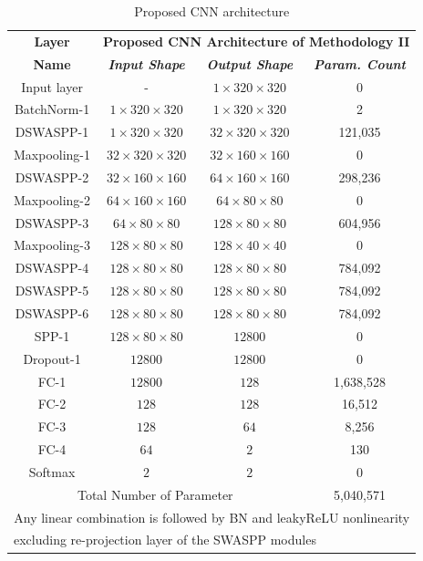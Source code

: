 \renewcommand{\arraystretch}{1.5}
\begin{table}[htbp]
    \caption{Proposed CNN architecture}
    \begin{center}
    \begin{tabular}{|c|c|c|c|}
    \hline
    \textbf{Layer}&\multicolumn{3}{|c|}{\textbf{Proposed CNN Architecture of Methodology II}} \\
    \cline{2-4} 
    \textbf{Name} & \textbf{\textit{Input Shape}}& \textbf{\textit{Output Shape}}& \textbf{\textit{Param. Count}} \\
    \hline
    Input layer & - & $1 \times 320 \times 320$ & 0 \\
    \hline
    BatchNorm-1 & $1 \times 320 \times 320$ & $1 \times 320 \times 320$ & 2 \\
    \hline
    DSWASPP-1& $1 \times 320 \times 320$ & $32 \times 320 \times 320$ & 121,035  \\
    \hline
    Maxpooling-1& $32 \times 320 \times 320$ &$32 \times 160 \times 160$ & 0 \\
    \hline
    DSWASPP-2& $32 \times 160 \times 160$ & $64 \times 160 \times 160$ & 298,236  \\
    \hline
    Maxpooling-2 & $64 \times 160 \times 160$ & $64 \times 80 \times 80$ &0  \\
    \hline
    DSWASPP-3  & $64 \times 80 \times 80$ & $128 \times 80 \times 80$ & 604,956  \\
    \hline
    Maxpooling-3 & $128 \times 80 \times 80$ & $128 \times 40 \times 40$ & 0  \\
    \hline
    DSWASPP-4  & $128 \times 80 \times 80$ & $128 \times 80 \times 80$ & 784,092 \\
    \hline
    DSWASPP-5  & $128 \times 80 \times 80$ & $128 \times 80 \times 80$ & 784,092 \\
    \hline
    DSWASPP-6  & $128 \times 80 \times 80$ & $128 \times 80 \times 80$ & 784,092 \\
    \hline
    SPP-1 & $128 \times 80 \times 80$ & $12800$ & 0 \\
    \hline
    Dropout-1 & $12800$ & $12800$ & 0 \\
    \hline
    FC-1 & $12800$ & $128$ & 1,638,528 \\
    \hline
    FC-2 & $128$ & $128$ & 16,512 \\
    \hline
    FC-3 & $128$ & $64$ & 8,256 \\
    \hline
    FC-4 & $64$ & $2$ & 130 \\
    \hline
    Softmax & $2$ & $2$ & 0 \\
    \hline
    \hline
    \multicolumn{3}{|c|}{Total Number of Parameter}&5,040,571\\
    \hline
    \multicolumn{4}{c}{Any linear combination is followed by BN and leakyReLU nonlinearity}\\
    \multicolumn{4}{l}{excluding re-projection layer of the SWASPP modules}
    \end{tabular}
    \label{PCNN}
    \end{center}
    \end{table}

